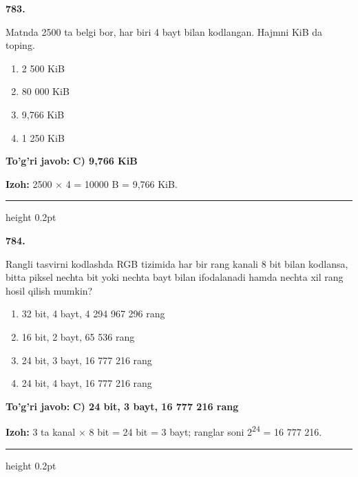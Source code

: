 \documentclass[10pt,a4paper,oneside]{article}
\begin{document}
\noindent\textbf{\color{ink}783.}
\par
Matnda 2500 ta belgi bor, har biri 4 bayt bilan kodlangan. Hajmni KiB da toping.
\begin{enumerate}[label=\Alph*),leftmargin=9mm]
\item 2 500 KiB
\item 80 000 KiB
\item 9,766 KiB
\item 1 250 KiB
\end{enumerate}
\begin{tcolorbox}[enhanced,breakable,colback=teal!4,colframe=teal!50!black,boxrule=0.5pt,arc=1.1mm,left=3mm,right=3mm,top=1.7mm,bottom=1.7mm,before skip=2mm,after skip=2mm]
\textbf{\color{teal}To'g'ri javob:} \textbf{C) 9,766 KiB}
\par\smallskip
\textbf{Izoh:} 2500 \ensuremath{\times} 4 = 10000 B = 9,766 KiB.
\end{tcolorbox}
\vspace{2mm}\hrule height 0.2pt \vspace{3mm}

\noindent\textbf{\color{ink}784.}
\par
Rangli tasvirni kodlashda RGB tizimida har bir rang kanali 8 bit bilan kodlansa, bitta piksel nechta bit yoki nechta bayt bilan ifodalanadi hamda nechta xil rang hosil qilish mumkin?
\begin{enumerate}[label=\Alph*),leftmargin=9mm]
\item 32 bit, 4 bayt, 4 294 967 296 rang
\item 16 bit, 2 bayt, 65 536 rang
\item 24 bit, 3 bayt, 16 777 216 rang
\item 24 bit, 4 bayt, 16 777 216 rang
\end{enumerate}
\begin{tcolorbox}[enhanced,breakable,colback=teal!4,colframe=teal!50!black,boxrule=0.5pt,arc=1.1mm,left=3mm,right=3mm,top=1.7mm,bottom=1.7mm,before skip=2mm,after skip=2mm]
\textbf{\color{teal}To'g'ri javob:} \textbf{C) 24 bit, 3 bayt, 16 777 216 rang}
\par\smallskip
\textbf{Izoh:} 3 ta kanal \ensuremath{\times} 8 bit = 24 bit = 3 bayt; ranglar soni 2\textsuperscript{2}\textsuperscript{4} = 16 777 216.
\end{tcolorbox}
\vspace{2mm}\hrule height 0.2pt \vspace{3mm}
\end{document}
